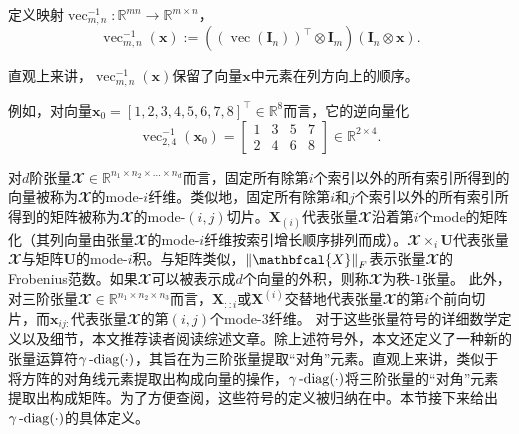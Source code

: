 
\begin{definition}[逆向量化]\kaishu
	定义映射$\operatorname{vec}^{-1}_{m,n}:\mathbb{R}^{mn}\rightarrow\mathbb{R}^{m\times n}$，
	\begin{equation*}
		\operatorname{vec}^{-1}_{m,n}(\boldsymbol{x}) := \left(\left(\operatorname{vec}\left(\boldsymbol{I}_{n}\right)\right)^{\top} \otimes \boldsymbol{I}_{m}\right)(\boldsymbol{I}_{n} \otimes \boldsymbol{x}).
	\end{equation*}
\end{definition}

直观上来讲，$\operatorname{vec}^{-1}_{m,n}(\boldsymbol{x})$保留了向量$\boldsymbol{x}$中元素在列方向上的顺序。

\begin{example}\kaishu
	例如，对向量$\boldsymbol{x}_{0}=[1,2,3,4,5,6,7,8]^{\top}\in\mathbb{R}^{8}$而言，它的逆向量化$$\operatorname{vec}^{-1}_{2,4}(\boldsymbol{x}_{0}) = \begin{bmatrix}1 & 3 & 5 & 7\\2 & 4 & 6 & 8\end{bmatrix} \in \mathbb{R}^{2\times 4}.$$
\end{example}

对$d$阶张量$\mathbfcal{X}\in\mathbb{R}^{n_1\times n_2\times \ldots \times n_{d}}$而言，固定所有除第$i$个索引以外的所有索引所得到的向量被称为$\mathbfcal{X}$的mode-$i$纤维。类似地，固定所有除第$i$和$j$个索引以外的所有索引所得到的矩阵被称为$\mathbfcal{X}$的mode-$(i,j)$切片。$\boldsymbol{X}_{(i)}$代表张量$\mathbfcal{X}$沿着第$i$个mode的矩阵化（其列向量由张量$\mathbfcal{X}$的mode-$i$纤维按索引增长顺序排列而成）。$\mathbfcal{X} \times_{i} \boldsymbol{U}$代表张量$\mathbfcal{X}$与矩阵$\boldsymbol{U}$的mode-$i$积。与矩阵类似，$\norm{\mathbfcal{X}}_{F}$表示张量$\mathbfcal{X}$的Frobenius范数。如果$\mathbfcal{X}$可以被表示成$d$个向量的外积，则称$\mathbfcal{X}$为秩-$1$张量。
此外，对三阶张量$\mathbfcal{X}\in\mathbb{R}^{n_1\times n_2\times n_3}$而言，$\boldsymbol{X}_{::i}$或$\boldsymbol{X}^{(i)}$交替地代表张量$\mathbfcal{X}$的第$i$个前向切片，而$\boldsymbol{x}_{ij:}$代表张量$\mathbfcal{X}$的第$(i,j)$个mode-$3$纤维。
对于这些张量符号的详细数学定义以及细节，本文推荐读者阅读综述文章。除上述符号外，本文还定义了一种新的张量运算符$\gamma\operatorname{-diag}(\cdot)$，其旨在为三阶张量提取“对角”元素。直观上来讲，类似于将方阵的对角线元素提取出构成向量的操作，$\gamma\operatorname{-diag}(\cdot)$将三阶张量的“对角”元素提取出构成矩阵。为了方便查阅，这些符号的定义被归纳在中。本节接下来给出$\gamma\operatorname{-diag}(\cdot)$的具体定义。

